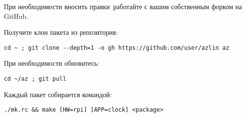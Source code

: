 
 \label{azclone}

При необходимости вносить правки\ работайте с вашим
собственным форком на GitHub.

Получите клон пакета из репозитория:

\begin{verbatim}
cd ~ ; git clone --depth=1 -o gh https://github.com/user/azlin az
\end{verbatim}

При необходимости обновитесь:

\begin{verbatim}
cd ~/az ; git pull
\end{verbatim}


Каждый пакет собирается командой:

\begin{verbatim}
./mk.rc && make [HW=rpi] [APP=clock] <package>
\end{verbatim}

